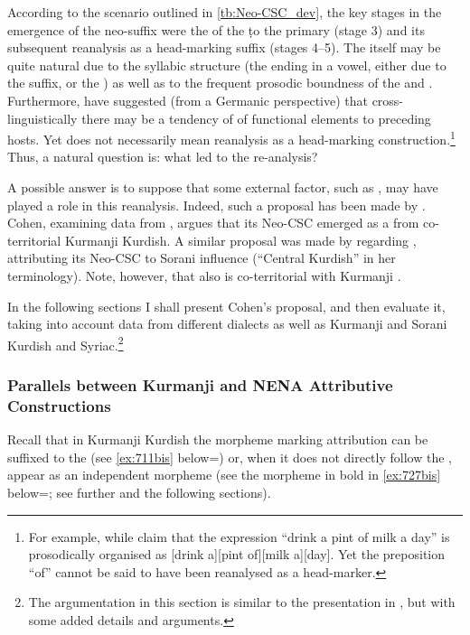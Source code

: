 According to the scenario outlined in \ref{tb:Neo-CSC_dev}, the key stages in the emergence of the neo-\cst* suffix \ed were the  of the \lnk* \d to the primary (stage 3) and its subsequent reanalysis as a head-marking suffix (stages 4--5). The  itself may be quite natural due to the syllabic structure (the \prim ending in a vowel, either due to the \emp* suffix, or the ) as well as to the frequent prosodic boundness of the \prim and \secn. Furthermore, \citet{LahiriPlank} have suggested (from a Germanic perspective) that cross-linguistically there may be a tendency of  of functional elements to preceding hosts. Yet   does not necessarily mean reanalysis as a head-marking construction.\footnote{For example, while \citet[376]{LahiriPlank} claim that the expression \enquote{drink a pint of milk a day} is prosodically organised as [drink a][pint of][milk a][day]. Yet  the preposition \enquote{of} cannot be said to have been reanalysed as a head-marker.} Thus, a natural question is: what led to the re-analysis?


 A possible answer is to suppose that some external factor, such as , may have played a role in this reanalysis. Indeed, such a proposal has been made by \citet[121ff.]{CohenEzafe}. Cohen, examining data from \JZax, argues that  its Neo-CSC emerged as a  \citep[in the sense of][]{MatrasSakel} from co-territorial Kurmanji Kurdish. A similar proposal was made by \citet[171, \S 2.21.2]{Garbell1965impact} regarding \JUrm, attributing its Neo-CSC to Sorani influence (\enquote{Central Kurdish} in her terminology). Note, however, that also \JUrm is co-territorial with Kurmanji \citep[see map of][171]{IzadyKurds}. 

In the following sections I shall present Cohen's proposal,  and then evaluate it, taking into account data from different  dialects as well as Kurmanji and Sorani Kurdish and Syriac.\footnote{The argumentation in this section is similar to the presentation in \citet{GutmanContact}, but with some added details and arguments.}

\subsubsection{Parallels between Kurmanji and NENA Attributive Constructions} \label{ss:parallel_ez}

Recall that in Kurmanji Kurdish the \ez* morpheme marking attribution can be suffixed to the  (see \ref{ex:711bis} below=) or, when it does not directly follow the , appear as an independent morpheme (see the  morpheme in bold in \ref{ex:727bis} below=; see further  and the following sections).

